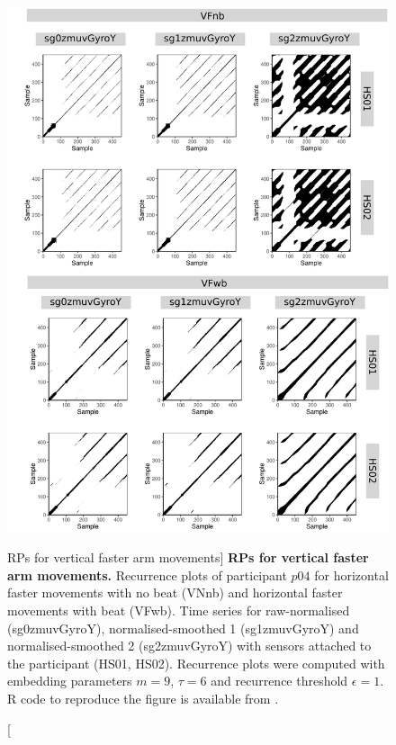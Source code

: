 \begin{figure}
\centering
\includegraphics[height=0.8\textheight]{rps_VF_w500_p04}
\caption
	[RPs for vertical faster arm movements]{
	{\bf RPs for vertical faster arm movements.}	
	Recurrence plots of participant $p04$ for 
	horizontal faster movements with no beat (VNnb) and
	horizontal faster movements with beat (VFwb).
	Time series for raw-normalised (sg0zmuvGyroY), 
	normalised-smoothed 1 (sg1zmuvGyroY) and 
	normalised-smoothed 2 (sg2zmuvGyroY) with
	sensors attached to the participant (HS01, HS02).
	Recurrence plots were computed with 
	embedding parameters $m=9$, $\tau=6$ and 
	recurrence threshold $\epsilon=1$.
	R code to reproduce the figure is available from \cite{hwum2018}.
        }
    \label{fig:rps_VF_w500_p04}
\end{figure}







